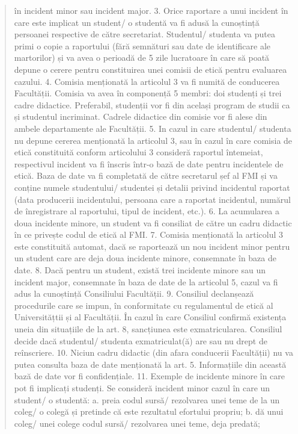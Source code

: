 \documentclass[paper=a4, fontsize=11pt]{scrartcl} %
\numberwithin{equation}{section} %
\numberwithin{figure}{section} %
\numberwithin{table}{section} %
\begin{document}
\begin{quote}
în incident minor sau incident major.
3. Orice raportare a unui incident în care este implicat un student/ o studentă va fi
adusă la cunoștință persoanei respective de către secretariat. Studentul/ studenta va
putea primi o copie a raportului (fără semnături sau date de identificare ale martorilor)
și va avea o perioadă de 5 zile lucratoare în care să poată depune o cerere pentru
constituirea unei comisii de etică pentru evaluarea cazului.
4. Comisia menționată la articolul 3 va fi numită de conducerea Facultății. Comisia va
avea în componență 5 membri: doi studenți și trei cadre didactice. Preferabil,
studenții vor fi din același program de studii ca și studentul incriminat. Cadrele
didactice din comisie vor fi alese din ambele departamente ale Facultății.
5. In cazul in care studentul/ studenta nu depune cererea menționată la articolul 3, sau
în cazul în care comisia de etică constituită conform articolului 3 consideră raportul
întemeiat, respectivul incident va fi înscris într-o bază de date pentru incidentele de
etică. Baza de date va fi completată de către secretarul șef al FMI și va conține
numele studentului/ studentei și detalii privind incidentul raportat (data producerii
incidentului, persoana care a raportat incidentul, numărul de înregistrare al raportului,
tipul de incident, etc.).
6. La acumularea a doua incidente minore, un student va fi consiliat de către un cadru
didactic în ce privește codul de etică al FMI.
7. Comisia menționată la articolul 3 este constituită automat, dacă se raportează un nou
incident minor pentru un student care are deja doua incidente minore, consemnate în
baza de date.
8. Dacă pentru un student, există trei incidente minore sau un incident major,
consemnate în baza de date de la articolul 5, cazul va fi adus la cunoștință Consiliului
Facultății.
9. Consiliul declanșează procedurile care se impun, în conformitate cu regulamentul de
etică al Universitățtii și al Facultății. În cazul în care Consiliul confirmă existența uneia
din situațiile de la art. 8, sancțiunea este exmatricularea. Consiliul decide dacă
studentul/ studenta exmatriculat(ă) are sau nu drept de reînscriere.
10. Niciun cadru didactic (din afara conducerii Facultății) nu va putea consulta baza de
date menționată la art. 5. Informațiile din această bază de date vor fi confidențiale.
11. Exemple de incidente minore în care pot fi implicați studenți.
Se consideră incident minor cazul în care un student/ o studentă:
a. preia codul sursă/ rezolvarea unei teme de la un coleg/ o colegă și pretinde că este
rezultatul efortului propriu;
b. dă unui coleg/ unei colege codul sursă/ rezolvarea unei teme, deja predată;

\end{quote}
\end{document}
